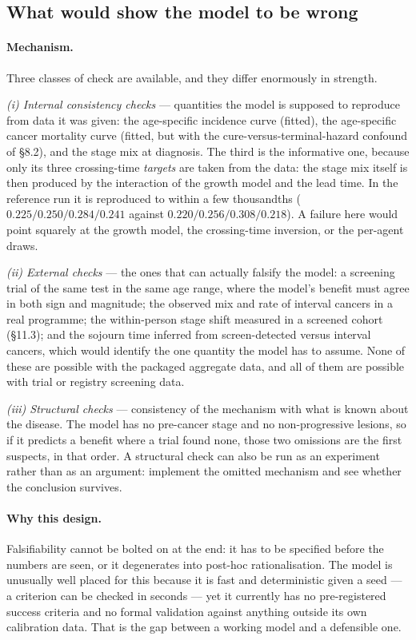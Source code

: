 \documentclass[12pt,a4paper]{article}
\newcommand{\mech}[1]{\paragraph{Mechanism.} #1}
\newcommand{\why}[1]{\paragraph{Why this design.} #1}
\begin{document}
\subsection{What would show the model to be wrong}

\mech{Three classes of check are available, and they differ enormously in strength.

\emph{(i) Internal consistency checks} --- quantities the model is supposed to reproduce from data it was
given: the age-specific incidence curve (fitted), the age-specific cancer mortality curve (fitted, but with
the cure-versus-terminal-hazard confound of \S8.2), and the stage mix at diagnosis. The third is the
informative one, because only its three crossing-time \emph{targets} are taken from the data: the stage mix
itself is then produced by the interaction of the growth model and the lead time. In the reference run it is
reproduced to within a few thousandths ($0.225/0.250/0.284/0.241$ against $0.220/0.256/0.308/0.218$). A
failure here would point squarely at the growth model, the crossing-time inversion, or the per-agent draws.

\emph{(ii) External checks} --- the ones that can actually falsify the model: a screening trial of the same
test in the same age range, where the model's benefit must agree in both sign and magnitude; the observed
mix and rate of interval cancers in a real programme; the within-person stage shift measured in a screened
cohort (\S11.3); and the sojourn time inferred from screen-detected versus interval cancers, which would
identify the one quantity the model has to assume. None of these are possible with the packaged aggregate
data, and all of them are possible with trial or registry screening data.

\emph{(iii) Structural checks} --- consistency of the mechanism with what is known about the disease. The
model has no pre-cancer stage and no non-progressive lesions, so if it predicts a benefit where a trial
found none, those two omissions are the first suspects, in that order. A structural check can also be run as
an experiment rather than as an argument: implement the omitted mechanism and see whether the conclusion
survives.}

\why{Falsifiability cannot be bolted on at the end: it has to be specified before the numbers are seen, or
it degenerates into post-hoc rationalisation. The model is unusually well placed for this because it is fast
and deterministic given a seed --- a criterion can be checked in seconds --- yet it currently has no
pre-registered success criteria and no formal validation against anything outside its own calibration data.
That is the gap between a working model and a defensible one.}
\end{document}
